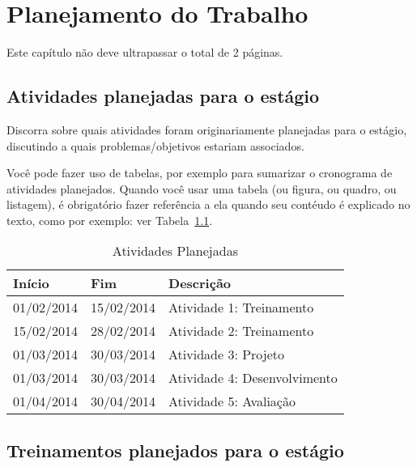 \chapter{Planejamento do Trabalho}\label{chap:atividadesPlanejadas}

Este capítulo não deve ultrapassar o total de 2 páginas.

\section{Atividades planejadas para o estágio}

Discorra sobre quais atividades foram originariamente planejadas para o estágio, discutindo a quais problemas/objetivos estariam associados.

Você pode fazer uso de tabelas, por exemplo para sumarizar o cronograma de atividades planejados. Quando você usar uma tabela (ou figura, ou quadro, ou listagem), é obrigatório fazer referência a ela quando seu contéudo é explicado no texto, como por exemplo: ver Tabela~\ref{tab:tab1}.

\begin{table}[h!]
\begin{center}
\caption[Atividades Planejadas]
{Atividades Planejadas}\label{tab:tab1}

\begin{tabular}{llp{7cm}} \hline

\hline
\textbf{Início}    & \textbf{Fim} &  \textbf{Descrição}                             \\
\hline
01/02/2014       & 15/02/2014                & Atividade 1: Treinamento \\
15/02/2014       & 28/02/2014                & Atividade 2: Treinamento\\
01/03/2014       & 30/03/2014                & Atividade 3: Projeto\\
01/03/2014       & 30/03/2014                & Atividade 4: Desenvolvimento\\
01/04/2014       & 30/04/2014                & Atividade 5: Avaliação\\ \hline

\hline
\end{tabular}
\end{center}
\end{table}

\section{Treinamentos planejados para o estágio}

